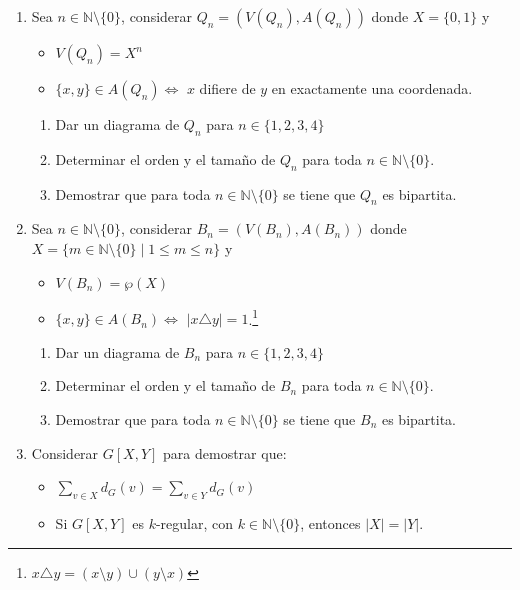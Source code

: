 \documentclass[10pt]{report}
\numberwithin{section}{chapter}
\newcommand{\N}{\mathbb N}
\begin{document}
\begin{enumerate}

\item Sea $n \in \N \setminus \{0\}$, considerar $Q_n = (V(Q_n), A(Q_n))$ donde $X=\{0,1\}$ y
\begin{itemize}
\item $V(Q_n) = X^n $
\item $\{x,y\} \in A(Q_n) \Leftrightarrow$ $x$ difiere de $y$ en exactamente una coordenada. 
\end{itemize}
\begin{enumerate}
\item Dar un diagrama de $Q_n$ para $n \in \{1,2,3,4\}$
\item Determinar el orden y el tamaño de $Q_n$ para toda $n \in \N \setminus \{0\}$.
\item Demostrar que para toda $n \in \N \setminus \{0\}$ se tiene que $Q_n$ es bipartita.
\end{enumerate}

\newpage

\item Sea $n \in \N \setminus \{0\}$, considerar $B_n = (V(B_n), A(B_n))$ donde $X=\{m \in \N \setminus \{0\} \; | \; 1 \leq m \leq n\}$ y
\begin{itemize}
\item $V(B_n) = \wp(X) $
\item $\{x,y\} \in A(B_n) \Leftrightarrow$ $|x \triangle y|=1$.\footnote{$x \triangle y = (x \setminus y) \cup (y \setminus x)$}
\end{itemize}
\begin{enumerate}
\item Dar un diagrama de $B_n$ para $n \in \{1,2,3,4\}$
\item Determinar el orden y el tamaño de $B_n$ para toda $n \in \N \setminus \{0\}$.
\item Demostrar que para toda $n \in \N \setminus \{0\}$ se tiene que $B_n$ es bipartita.
\end{enumerate}

\item Considerar $G[X,Y]$ para demostrar que:
\begin{itemize}
\item $\mathop \sum \limits_{v \in X} d_G(v) = \mathop \sum \limits_{v \in Y} d_G(v)$
\item Si $G[X,Y]$ es $k$-regular, con $k \in \N \setminus \{0\}$, entonces $|X| =|Y|$. 
\end{itemize}



\end{enumerate}
\end{document}
